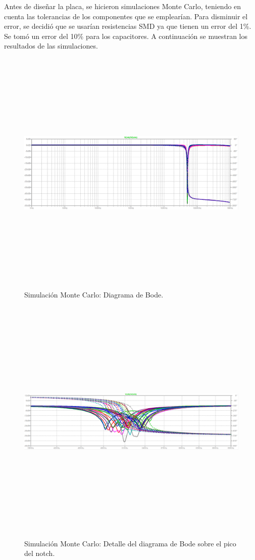Antes de dise\~nar la placa, se hicieron simulaciones Monte Carlo, teniendo en cuenta las tolerancias de los componentes que se emplear\'ian. Para disminuir el error, se decidi\'o que se usar\'ian resistencias SMD ya que tienen un error del 1\%. Se tom\'o un error del 10\% para los capacitores. A continuaci\'on se muestran los resultados de las simulaciones. 

\begin{figure}[H] %
	\centering	\includegraphics[width=12cm,height=12cm,keepaspectratio]{../EJ4/graficos/h_montecarlo_malo.png}
	\caption{Simulaci\'on Monte Carlo: Diagrama de Bode.}
	\label{sim_bode}
\end{figure}

\begin{figure}[H] %
	\centering	\includegraphics[width=12cm,height=12cm,keepaspectratio]{../EJ4/graficos/h_montecarlo_caps.png}
	\caption{Simulaci\'on Monte Carlo: Detalle del diagrama de Bode sobre el pico del notch.}
	\label{sim_bode_caps}
\end{figure}

